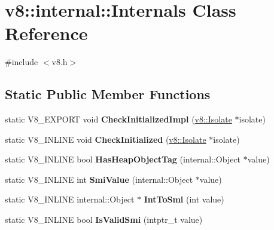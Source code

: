 \hypertarget{classv8_1_1internal_1_1Internals}{\section{v8\-:\-:internal\-:\-:Internals Class Reference}
\label{classv8_1_1internal_1_1Internals}
}


{\ttfamily \#include $<$v8.\-h$>$}

\subsection*{Static Public Member Functions}
\begin{DoxyCompactItemize}
\item 
\hypertarget{classv8_1_1internal_1_1Internals_ac5141eba7a786f0fa9f6db658f25d4ba}{static V8\-\_\-\-E\-X\-P\-O\-R\-T void {\bfseries Check\-Initialized\-Impl} (\hyperlink{classv8_1_1Isolate}{v8\-::\-Isolate} $\ast$isolate)}\label{classv8_1_1internal_1_1Internals_ac5141eba7a786f0fa9f6db658f25d4ba}

\item 
\hypertarget{classv8_1_1internal_1_1Internals_a1aa4bc86bc011f055fe27d18e0849b8c}{static V8\-\_\-\-I\-N\-L\-I\-N\-E void {\bfseries Check\-Initialized} (\hyperlink{classv8_1_1Isolate}{v8\-::\-Isolate} $\ast$isolate)}\label{classv8_1_1internal_1_1Internals_a1aa4bc86bc011f055fe27d18e0849b8c}

\item 
\hypertarget{classv8_1_1internal_1_1Internals_a0d611390ea5dde42847fe8237e4ced9d}{static V8\-\_\-\-I\-N\-L\-I\-N\-E bool {\bfseries Has\-Heap\-Object\-Tag} (internal\-::\-Object $\ast$value)}\label{classv8_1_1internal_1_1Internals_a0d611390ea5dde42847fe8237e4ced9d}

\item 
\hypertarget{classv8_1_1internal_1_1Internals_acdd6e8e3d151402cfa9eea84e3023a78}{static V8\-\_\-\-I\-N\-L\-I\-N\-E int {\bfseries Smi\-Value} (internal\-::\-Object $\ast$value)}\label{classv8_1_1internal_1_1Internals_acdd6e8e3d151402cfa9eea84e3023a78}

\item 
\hypertarget{classv8_1_1internal_1_1Internals_a9e5ab52581c9c32ac018fb1cc98ab5fa}{static V8\-\_\-\-I\-N\-L\-I\-N\-E internal\-::\-Object $\ast$ {\bfseries Int\-To\-Smi} (int value)}\label{classv8_1_1internal_1_1Internals_a9e5ab52581c9c32ac018fb1cc98ab5fa}

\item 
\hypertarget{classv8_1_1internal_1_1Internals_a69b0abda8cf242042f4f19bcba35fd18}{static V8\-\_\-\-I\-N\-L\-I\-N\-E bool {\bfseries Is\-Valid\-Smi} (intptr\-\_\-t value)}\label{classv8_1_1internal_1_1Internals_a69b0abda8cf242042f4f19bcba35fd18}


\end{DoxyCompactItemize}
